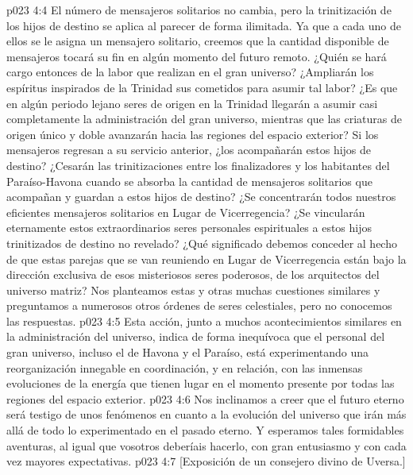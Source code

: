 \vs p023 4:4 El número de mensajeros solitarios no cambia, pero la trinitización de los hijos de destino se aplica al parecer de forma ilimitada. Ya que a cada uno de ellos se le asigna un mensajero solitario, creemos que la cantidad disponible de mensajeros tocará su fin en algún momento del futuro remoto. ¿Quién se hará cargo entonces de la labor que realizan en el gran universo? ¿Ampliarán los espíritus inspirados de la Trinidad sus cometidos para asumir tal labor? ¿Es que en algún periodo lejano seres de origen en la Trinidad llegarán a asumir casi completamente la administración del gran universo, mientras que las criaturas de origen único y doble avanzarán hacia las regiones del espacio exterior? Si los mensajeros regresan a su servicio anterior, ¿los acompañarán estos hijos de destino? ¿Cesarán las trinitizaciones entre los finalizadores y los habitantes del Paraíso\hyp{}Havona cuando se absorba la cantidad de mensajeros solitarios que acompañan y guardan a estos hijos de destino? ¿Se concentrarán todos nuestros eficientes mensajeros solitarios en Lugar de Vicerregencia? ¿Se vincularán eternamente estos extraordinarios seres personales espirituales a estos hijos trinitizados de destino no revelado? ¿Qué significado debemos conceder al hecho de que estas parejas que se van reuniendo en Lugar de Vicerregencia están bajo la dirección exclusiva de esos misteriosos seres poderosos, de los arquitectos del universo matriz? Nos planteamos estas y otras muchas cuestiones similares y preguntamos a numerosos otros órdenes de seres celestiales, pero no conocemos las respuestas.
\vs p023 4:5 \pc Esta acción, junto a muchos acontecimientos similares en la administración del universo, indica de forma inequívoca que el personal del gran universo, incluso el de Havona y el Paraíso, está experimentando una reorganización innegable en coordinación, y en relación, con las inmensas evoluciones de la energía que tienen lugar en el momento presente por todas las regiones del espacio exterior.
\vs p023 4:6 Nos inclinamos a creer que el futuro eterno será testigo de unos fenómenos en cuanto a la evolución del universo que irán más allá de todo lo experimentado en el pasado eterno. Y esperamos tales formidables aventuras, al igual que vosotros deberíais hacerlo, con gran entusiasmo y con cada vez mayores expectativas.
\vsetoff
\vs p023 4:7 [Exposición de un consejero divino de Uversa.]
